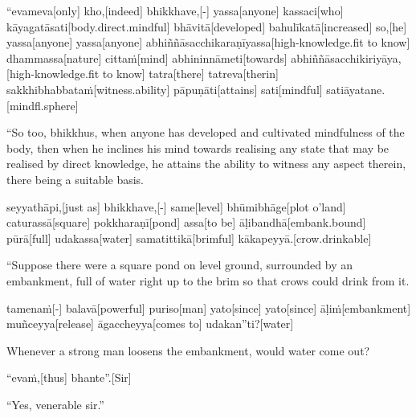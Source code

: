 \begin{samepage}
\begingl[glneveryline={\PaliGlossA,\PaliGlossB}]
“evameva[only] kho,[indeed] bhikkhave,[-] yassa[anyone] kassaci[who] kāyagatāsati[body.direct.mindful] bhāvitā[developed] bahulīkatā[increased] so,[he] yassa[anyone] yassa[anyone] abhiññāsacchikaraṇīyassa[high-knowledge.fit to know] dhammassa[nature] cittaṁ[mind] abhininnāmeti[towards] abhiññāsacchikiriyāya,[high-knowledge.fit to know] tatra[there] tatreva[therin] sakkhibhabbataṁ[witness.ability] pāpuṇāti[attains] sati[mindful] satiāyatane.[mindfl.sphere]
\endgl
\nopagebreak
\linespread{0.5}
\begin{spacin}{0.2}
{\PaliGlossFT “So too, bhikkhus, when anyone has developed and cultivated mindfulness of the body, then when he inclines his mind towards realising any state that may be realised by direct knowledge, he attains the ability to witness any aspect therein, there being a suitable basis.}
\end{spacin}
\vskip 12pt
\end{samepage}
\begin{samepage}
\begingl[glneveryline={\PaliGlossA,\PaliGlossB}]
seyyathāpi,[just as] bhikkhave,[-] same[level] bhūmibhāge[plot o'land] caturassā[square] pokkharaṇī[pond] assa[to be] āḷibandhā[embank.bound] pūrā[full] udakassa[water] samatittikā[brimful] kākapeyyā.[crow.drinkable]
\endgl
\nopagebreak
\linespread{0.5}
\begin{spacin}{0.2}
{\PaliGlossFT “Suppose there were a square pond on level ground, surrounded by an embankment, full of water right up to the brim so that crows could drink from it.}
\end{spacin}
\vskip 12pt
\end{samepage}
\begin{samepage}
\begingl[glneveryline={\PaliGlossA,\PaliGlossB}]
tamenaṁ[-] balavā[powerful] puriso[man] yato[since] yato[since] āḷiṁ[embankment] muñceyya[release] āgaccheyya[comes to] udakan”ti?[water]
\endgl
\nopagebreak
\linespread{0.5}
\begin{spacin}{0.2}
{\PaliGlossFT Whenever a strong man loosens the embankment, would water come out?}
\end{spacin}
\vskip 12pt
\end{samepage}
\begin{samepage}
\begingl[glneveryline={\PaliGlossA,\PaliGlossB}]
“evaṁ,[thus] bhante”.[Sir]
\endgl
\nopagebreak
\linespread{0.5}
\begin{spacin}{0.2}
{\PaliGlossFT “Yes, venerable sir.”}
\end{spacin}
\vskip 12pt
\end{samepage}
